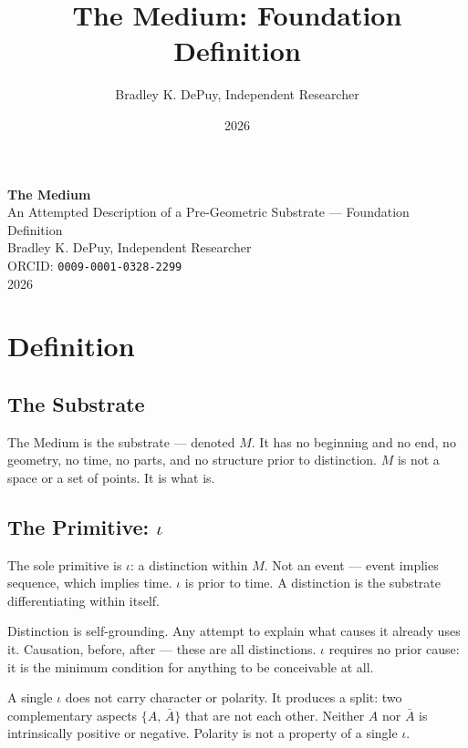 \documentclass[11pt,letterpaper]{article}
\author{Bradley K. DePuy, Independent Researcher}
\date{2026}
\title{The Medium: Foundation Definition}
\begin{document}
\pagestyle{plain}
\begin{titlepage}
\vspace*{4cm}
\begin{center}
  {\LARGE\bfseries The Medium}\\[0.6em]
  {\large An Attempted Description of a Pre-Geometric Substrate --- Foundation Definition}\\[2.5em]
  {\normalsize Bradley K. DePuy, Independent Researcher}\\[0.5em]
  {\normalsize ORCID: \mbox{\texttt{0009-0001-0328-2299}}}\\[0.5em]
  {\normalsize 2026}
\end{center}
\end{titlepage}
\pagestyle{body}

\section{Definition}
\label{sec:org9acd5b1}

\subsection{The Substrate}
\label{sec:org227eb43}

The Medium is the substrate --- denoted \(M\). It has no beginning and no end, no geometry, no time, no parts, and no structure prior to distinction. \(M\) is not a space or a set of points. It is what is.

\subsection{The Primitive: \(\iota\)}
\label{sec:org6b3372e}

The sole primitive is \(\iota\): a distinction within \(M\). Not an event --- event implies sequence, which implies time. \(\iota\) is prior to time. A distinction is the substrate differentiating within itself.

Distinction is self-grounding. Any attempt to explain what causes it already uses it. Causation, before, after --- these are all distinctions. \(\iota\) requires no prior cause: it is the minimum condition for anything to be conceivable at all.

A single \(\iota\) does not carry character or polarity. It produces a split: two complementary aspects \(\{A,\, \bar{A}\}\) that are not each other. Neither \(A\) nor \(\bar{A}\) is intrinsically positive or negative. Polarity is not a property of a single \(\iota\).
\end{document}
